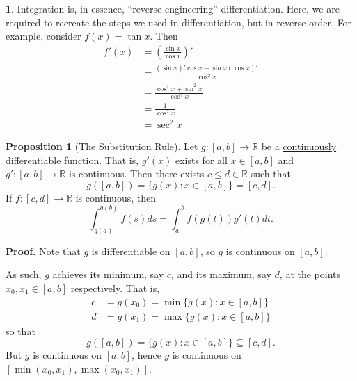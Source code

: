 \documentclass[11pt]{article}
\theoremstyle{definition}
\newtheorem{prop}[thm]{Proposition}
\newtheorem{none}[thm]{}
\newcommand{\mbR}{\ensuremath{\mathbb{R}}}
\begin{document}
\begin{none}
Integration is, in essence, ``reverse engineering'' differentiation. Here, we are required to recreate the steps we used in differentiation, but in reverse order. For example, consider $f(x) = \tan x \text{.}$ Then
\begin{align*}
f'(x) & = \left(\frac{\sin x}{\cos x}\right)' \\
& = \frac{(\sin x)'\cos x - \sin x(\cos x)'}{\cos^2 x} \\
& = \frac{\cos^2x + \sin^2x}{\cos^2x} \\
& = \frac{1}{\cos^2x} \\
& = \sec^2x
\end{align*}
\end{none}

\begin{prop}[The Substitution Rule]
Let $g : [a, b] \to \mbR$ be a \underline{continuously differentiable} function. That is, $g'(x)$ exists for all $x\in[a, b]$ and $g' : [a, b] \to \mbR$ is continuous. 
Then there exists $c \leq d \in \mbR$ such that
$$g([a, b]) = \{g(x) : x \in [a, b]\} = [c, d] \text{.}$$
If $f : [c, d] \to \mbR$ is continuous, then
$$\int_{g(a)}^{g(b)} f(s)ds = \int_a^b f\left(g(t)\right) g'(t)dt \text{.}$$
\end{prop}
\textbf{Proof.} Note that $g$ is differentiable on $[a, b]$, so $g$ is continuous on $[a, b]$. 

As such, $g$ achieves its minimum, say $c$, and its maximum, say $d$, at the points $x_0, x_1 \in [a, b]$ respectively. That is,
\begin{align*}
c & = g(x_0) = \min\{g(x) : x \in [a, b]\} \\
d & = g(x_1) = \max\{g(x) : x \in [a, b]\}
\end{align*}
so that
$$g([a, b]) = \{g(x) : x \in [a, b]\} \subseteq [c, d] \text{.}$$
But $g$ is continuous on $[a, b]$, hence $g$ is continuous on $[\min(x_0, x_1), \max(x_0, x_1)]$. 
\end{document}
